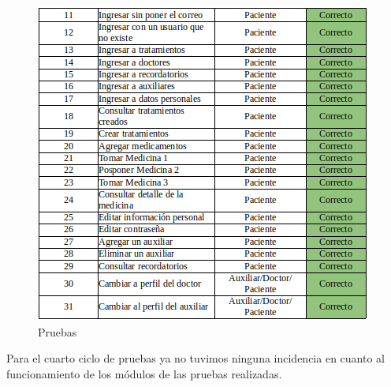 \begin{figure}[!htbp]			
	\hypertarget{fig:Pruebas4}{\hspace{1pt}}
	\begin{center}
		\includegraphics[height=0.4\textheight]{Pruebas/images/pcc2}
		\caption{Pruebas}
		\label{fig:Pruebas4}
	\end{center}
\end{figure}
\newpage
Para el cuarto ciclo de pruebas ya no tuvimos ninguna incidencia en cuanto al funcionamiento de los módulos de las pruebas realizadas.

